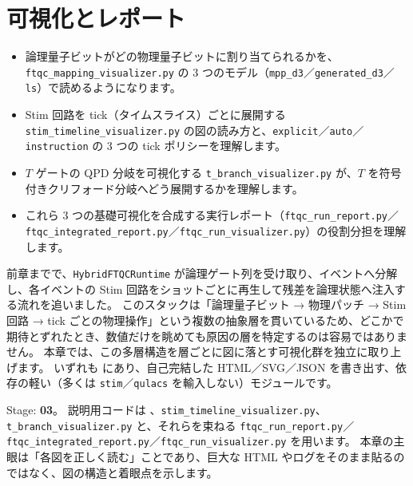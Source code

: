 \chapter{可視化とレポート}\label{ch:visualization}

\begin{chaptergoal}
  \begin{itemize}
  \item 論理量子ビットがどの物理量子ビットに割り当てられるかを、\texttt{ftqc\_mapping\_visualizer.py} の 3 つのモデル（\texttt{mpp\_d3}／\texttt{generated\_d3}／\texttt{ls}）で読めるようになります。
  \item Stim 回路を tick（タイムスライス）ごとに展開する \texttt{stim\_timeline\_visualizer.py} の図の読み方と、\texttt{explicit}／\texttt{auto}／\texttt{instruction} の 3 つの tick ポリシーを理解します。
  \item $T$ ゲートの QPD 分岐を可視化する \texttt{t\_branch\_visualizer.py} が、$T$ を符号付きクリフォード分岐へどう展開するかを理解します。
  \item これら 3 つの基礎可視化を合成する実行レポート（\texttt{ftqc\_run\_report.py}／\texttt{ftqc\_integrated\_report.py}／\texttt{ftqc\_run\_visualizer.py}）の役割分担を理解します。
  \end{itemize}
\end{chaptergoal}

前章までで、\texttt{HybridFTQCRuntime} が論理ゲート列を受け取り、イベントへ分解し、各イベントの Stim 回路をショットごとに再生して残差を論理状態へ注入する流れを追いました。
このスタックは「論理量子ビット → 物理パッチ → Stim 回路 → tick ごとの物理操作」という複数の抽象層を貫いているため、どこかで期待とずれたとき、数値だけを眺めても原因の層を特定するのは容易ではありません。
本章では、この多層構造を層ごとに図に落とす可視化群を独立に取り上げます。
いずれも  にあり、自己完結した HTML／SVG／JSON を書き出す、依存の軽い（多くは \texttt{stim}／\texttt{qulacs} を輸入しない）モジュールです。

\begin{notebox}
  Stage: \textbf{03}。
  説明用コードは 、\texttt{stim\_timeline\_visualizer.py}、\texttt{t\_branch\_visualizer.py} と、それらを束ねる \texttt{ftqc\_run\_report.py}／\texttt{ftqc\_integrated\_report.py}／\texttt{ftqc\_run\_visualizer.py} を用います。
  本章の主眼は「各図を正しく読む」ことであり、巨大な HTML やログをそのまま貼るのではなく、図の構造と着眼点を示します。
\end{notebox}

